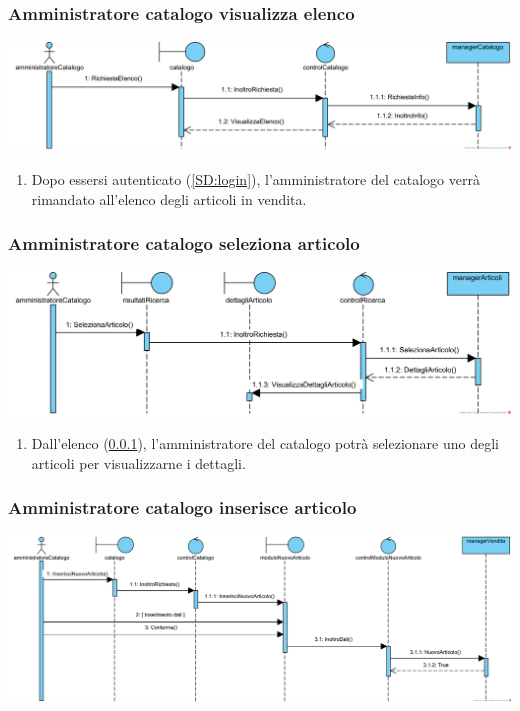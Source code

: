 \documentclass[12pt,a4paper]{article}
\begin{document}
\subsubsection{Amministratore catalogo visualizza elenco}
\label{SD:amcatvisualizzaelenco}
\begin{center}
\includegraphics[width=\textwidth]{SequenceDiagram/AmministratoreCatalogoVisualizzaElenco}
\end{center}

\begin{enumerate}
\item Dopo essersi autenticato (\ref{SD:login}), l'amministratore del catalogo verrà rimandato all'elenco degli articoli in vendita.
\end{enumerate}

\subsubsection{Amministratore catalogo seleziona articolo}
\label{SD:amcatselezionaarticolo}
\begin{center}
\includegraphics[width=\textwidth]{SequenceDiagram/AmministratoreCatalogoSelezionaArticolo}
\end{center}

\begin{enumerate}
\item Dall'elenco (\ref{SD:amcatvisualizzaelenco}), l'amministratore del catalogo potrà selezionare uno degli articoli per visualizzarne i dettagli.
\end{enumerate}

\subsubsection{Amministratore catalogo inserisce articolo}
\label{SD:amcatinseriscearticolo}
\begin{center}
\includegraphics[width=\textwidth]{SequenceDiagram/AmministratoreCatalogoInserisceNuovoArticolo}
\end{center}
\end{document}
